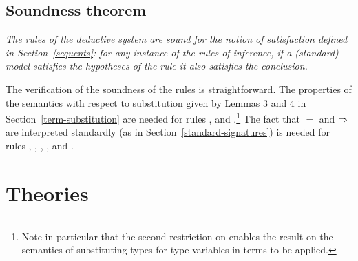 \subsection{Soundness theorem}
\label{soundness}

\emph{The rules of the \HOL{} deductive system are {\em sound} for
  the notion of satisfaction defined in Section~\ref{sequents}: for
  any instance of the rules of inference, if a (standard) model
  satisfies the hypotheses of the rule it also satisfies the
  conclusion.}

\medskip

The verification of the soundness of the rules is straightforward.
The properties of the semantics with respect to substitution given by
Lemmas 3 and 4 in Section~\ref{term-substitution} are needed for rules
,  and
.\footnote{Note in
  particular that the second restriction on  enables
  the result on the semantics of substituting types for type variables
  in terms to be applied.}  The fact that $=$ and $\Rightarrow$ are
interpreted standardly (as in Section~\ref{standard-signatures}) is
needed for rules ,
,
, ,
 and .

\section{\HOL{} Theories}
\label{theories}

